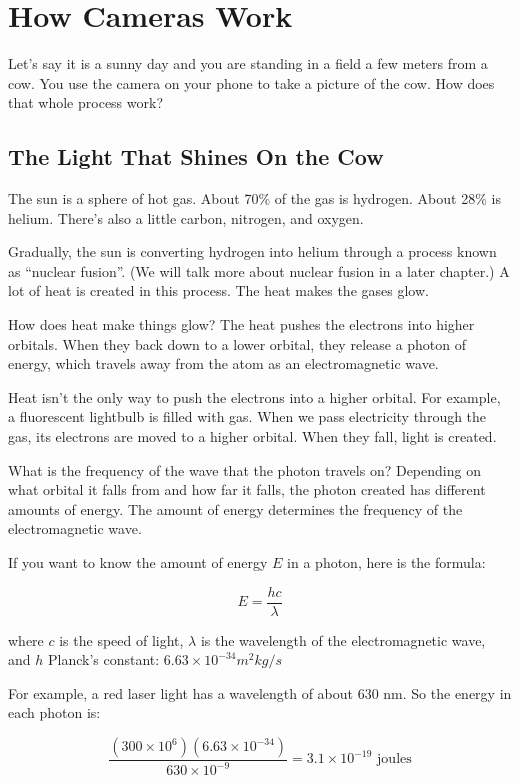 \chapter{How Cameras Work}

Let's say it is a sunny day and you are standing in a field a few meters
from a cow. You use the camera on your phone to take a picture of the
cow. How does that whole process work?

\section{The Light That Shines On the Cow}

The sun is a sphere of hot gas. About 70\% of the gas is
hydrogen. About 28\% is helium. There's also a little carbon, nitrogen,
and oxygen.

Gradually, the sun is converting hydrogen into helium through a
process known as ``nuclear fusion''. (We will talk more about nuclear
fusion in a later chapter.) A lot of heat is created in this
process. The heat makes the gases glow.

How does heat make things glow? The heat pushes the electrons into
higher orbitals.  When they back down to a lower orbital, they
release a photon of energy, which travels away from the atom as an
electromagnetic wave.

Heat isn't the only way to push the electrons into a higher
orbital. For example, a fluorescent lightbulb is filled with gas.
When we pass electricity through the gas, its electrons are moved to a
higher orbital.  When they fall, light is created.

What is the frequency of the wave that the photon travels on?
Depending on what orbital it falls from and how far it falls, the
photon created has different amounts of energy. The amount of energy
determines the frequency of the electromagnetic wave.

\begin{mdframed}[style=important, frametitle={Formula for enegy of a photon}]

If you want to know the amount of energy $E$ in a photon, here is the formula:

$$E = \frac{h c}{\lambda}$$

where $c$ is the speed of light, $\lambda$ is the wavelength of the
electromagnetic wave, and $h$ Planck's constant: $6.63 \times 10^{-34} m^2 kg/s$

For example, a red laser light has a wavelength of about 630 nm. So the energy in each photon is:

$$\frac{(300 \times 10^6) (6.63 \times 10^{-34})}{630 \times 10^{-9}} = 3.1 \times 10^{-19} \text{ joules}$$

\end{mdframed}

